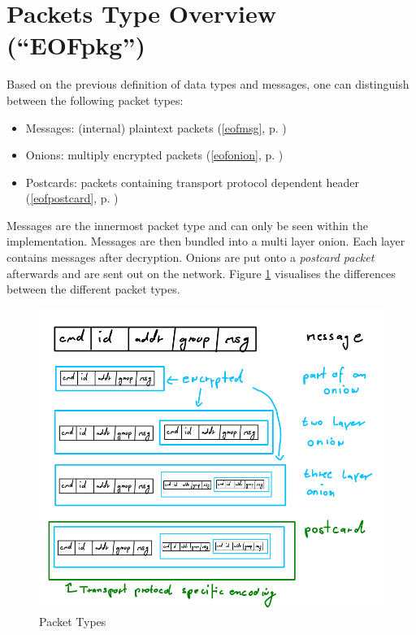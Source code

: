 \section{Packets Type Overview ("`EOFpkg"')}
\label{eofpkg}
Based on the previous definition of data types and messages, one
can distinguish between the following packet types:
\begin{itemize}
\item Messages: (internal) plaintext packets (\ref{eofmsg}, p. \pageref{eofmsg})
\item Onions: multiply encrypted packets (\ref{eofonion}, p. \pageref{eofonion})
\item Postcards: packets containing transport protocol dependent header (\ref{eofpostcard}, p. \pageref{eofpostcard})
\end{itemize}
Messages are the innermost packet type and can only be seen within
the implementation.
Messages are then bundled into a multi layer onion. 
Each layer contains messages after decryption.
Onions are put onto a \textit{postcard packet} 
afterwards and are sent out on the network.
Figure \ref{packettypes} visualises the differences between the 
different packet types.
\begin{figure}[htb]
    \centering
    \caption{Packet Types}
    \label{packettypes}
    \includegraphics[scale=0.7]{packet-types.png}
\end{figure}
